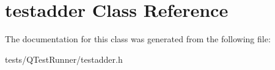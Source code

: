 \hypertarget{classtestadder}{\section{testadder Class Reference}
\label{classtestadder}
}


The documentation for this class was generated from the following file\+:\begin{DoxyCompactItemize}
\item 
tests/\+Q\+Test\+Runner/testadder.\+h\end{DoxyCompactItemize}

